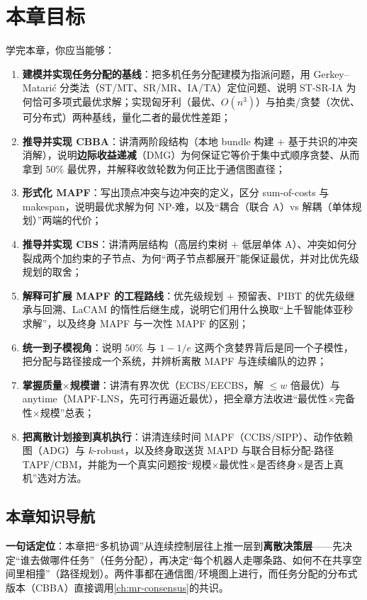 \section*{本章目标}
学完本章，你应当能够：
\begin{enumerate}
  \item \textbf{建模并实现任务分配的基线}：把多机任务分配建模为指派问题，用 Gerkey--Matari\'c 分类法（ST/MT、SR/MR、IA/TA）定位问题、说明 ST-SR-IA 为何恰可多项式最优求解；实现匈牙利（最优、$O(n^3)$）与拍卖/贪婪（次优、可分布式）两种基线，量化二者的最优性差距；
  \item \textbf{推导并实现 CBBA}：讲清两阶段结构（本地 bundle 构建 $+$ 基于共识的冲突消解），说明\textbf{边际收益递减}（DMG）为何保证它等价于集中式顺序贪婪、从而拿到 $50\%$ 最优界，并解释收敛轮数为何正比于通信图直径；
  \item \textbf{形式化 MAPF}：写出顶点冲突与边冲突的定义，区分 sum-of-costs 与 makespan，说明最优求解为何 NP-难，以及“耦合（联合 A\*）vs 解耦（单体规划）”两端的代价；
  \item \textbf{推导并实现 CBS}：讲清两层结构（高层约束树 $+$ 低层单体 A\*）、冲突如何分裂成两个加约束的子节点、为何“两子节点都展开”能保证最优，并对比优先级规划的取舍；
  \item \textbf{解释可扩展 MAPF 的工程路线}：优先级规划 $+$ 预留表、PIBT 的优先级继承与回溯、LaCAM 的惰性后继生成，说明它们用什么换取“上千智能体亚秒求解”，以及终身 MAPF 与一次性 MAPF 的区别；
  \item \textbf{统一到子模视角}：说明 $50\%$ 与 $1-1/e$ 这两个贪婪界背后是同一个子模性，把分配与路径接成一个系统，并辨析离散 MAPF 与连续编队的边界；
  \item \textbf{掌握质量$\times$规模谱}：讲清有界次优（ECBS/EECBS，解 $\le w$ 倍最优）与 anytime（MAPF-LNS，先可行再逼近最优），把全章方法收进“最优性$\times$完备性$\times$规模”总表；
  \item \textbf{把离散计划接到真机执行}：讲清连续时间 MAPF（CCBS/SIPP）、动作依赖图（ADG）与 $k$-robust，以及终身取送货 MAPD 与联合目标分配-路径 TAPF/CBM，并能为一个真实问题按“规模$\times$最优性$\times$是否终身$\times$是否上真机”选对方法。
\end{enumerate}

\subsection*{本章知识导航}
\textbf{一句话定位}：本章把“多机协调”从连续控制层往上推一层到\textbf{离散决策层}——先决定“谁去做哪件任务”（任务分配），再决定“每个机器人走哪条路、如何不在共享空间里相撞”（路径规划）。两件事都在通信图/环境图上进行，而任务分配的分布式版本（CBBA）直接调用\cref{ch:mr-consensus}的共识。

